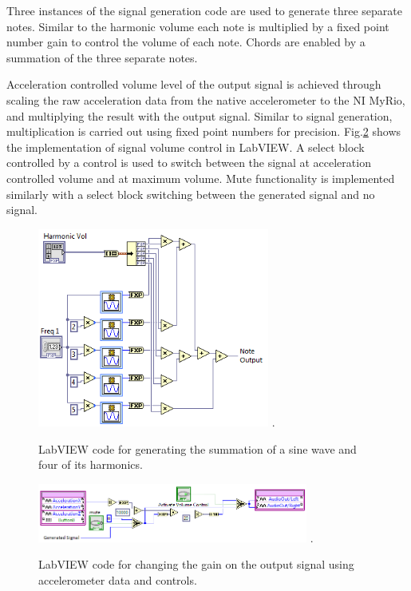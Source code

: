 Three instances of the signal generation code are used to generate three separate notes.
 Similar to the harmonic volume each note is multiplied by a fixed point number gain to control the volume of each note.
 Chords are enabled by a summation of the three separate notes.

Acceleration controlled volume level of the output signal is achieved through scaling the raw acceleration data from the native accelerometer to the NI MyRio, and multiplying the result with the output signal.
 Similar to signal generation, multiplication is carried out using fixed point numbers for precision.
 Fig.\ref{fig_accvol} shows the implementation of signal volume control in LabVIEW.
 A select block controlled by a control is used to switch between the signal at acceleration controlled volume and at maximum volume.
 Mute functionality is implemented similarly with a select block switching between the generated signal and no signal.


\begin{figure}[!t]
\centering
\includegraphics[width=3in]{NoteGeneration.png}
\DeclareGraphicsExtensions.
\caption{LabVIEW code for generating the summation of a sine wave and four of its harmonics.}
\label{fig_notegen}
\end{figure} 

\begin{figure}[!t]
\centering
\includegraphics[width=3.5in]{AccelerometerVolume.png}
\DeclareGraphicsExtensions.
\caption{LabVIEW code for changing the gain on the output signal using accelerometer data and controls.}
\label{fig_accvol}
\end{figure} 

